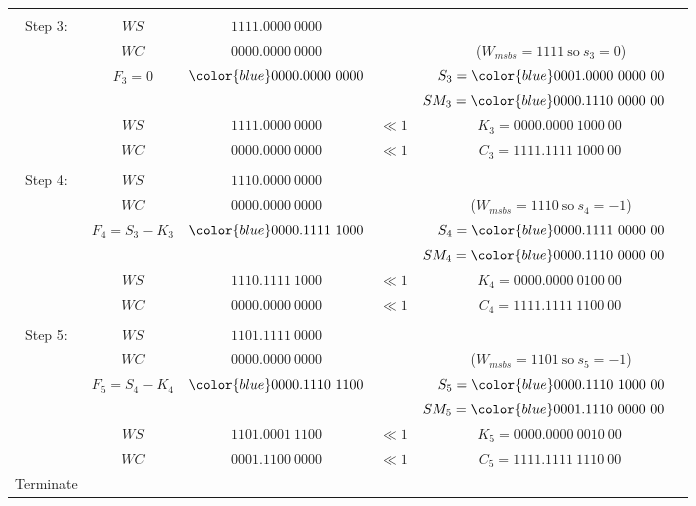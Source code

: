 \documentclass[12pt]{article}
\begin{document}
{\begin{center}
\begin{tabular}{ccccc}
    \hdashline\\
    Step 3: &$WS            $&$         1111.0000\ 0000     $&          &\\
            &$WC            $&$         0000.0000\ 0000     $&          &($W_{msbs}=1111\ \text{so}\ s_3=0$)\\
            &$F_3=0         $&${\color{blue}0000.0000}\ 0000$&          &$S_3={\color{blue}0001.000}0\ 0000\ 00$\\
            &                &                               &          &$SM_3={\color{blue}0000.111}0\ 0000\ 00\phantom{M}$\\
    \cline{2-3}
            &$WS            $&$1111.0000\ 0000              $&$\ll1    $&$K_3=0000.0000\ 1000\ 00\ $\\
            &$WC            $&$0000.0000\ 0000              $&$\ll1    $&$C_3=1111.1111\ 1000\ 00\,$\\
    \hdashline\\
    Step 4: &$WS            $&$1110.0000\ 0000              $&          &\\
            &$WC            $&$0000.0000\ 0000              $&          &($W_{msbs}=1110\ \text{so}\ s_4=-1$)\\
            &$F_4=S_3-K_3   $&${\color{blue}0000.1111\ 1}000$&          &$S_4={\color{blue}0000.1111}\ 0000\ 00$\\
            &                &                               &          &$SM_4={\color{blue}0000.1110}\ 0000\ 00\phantom{M}$\\
    \cline{2-3}
            &$WS            $&$1110.1111\ 1000              $&$\ll1    $&$K_4=0000.0000\ 0100\ 00\ $\\
            &$WC            $&$0000.0000\ 0000              $&$\ll1    $&$C_4=1111.1111\ 1100\ 00\,$\\
    \hdashline\\
    Step 5: &$WS            $&$1101.1111\ 0000              $&          &\\
            &$WC            $&$0000.0000\ 0000              $&          &($W_{msbs}=1101\ \text{so}\ s_5=-1$)\\
            &$F_5=S_4-K_4   $&${\color{blue}0000.1110\ 11}00$&          &$S_5={\color{blue}0000.1110\ 1}000\ 00$\\
            &                &                                   &          &$SM_5={\color{blue}0001.1110\ 0}000\ 00\phantom{M}$\\
    \cline{2-3}
            &$WS            $&$1101.0001\ 1100              $&$\ll1    $&$K_5=0000.0000\ 0010\ 00\ $\\
            &$WC            $&$0001.1100\ 0000              $&$\ll1    $&$C_5=1111.1111\ 1110\ 00\,$\\
    Terminate
\end{tabular}
\end{center}
}
\end{document}
